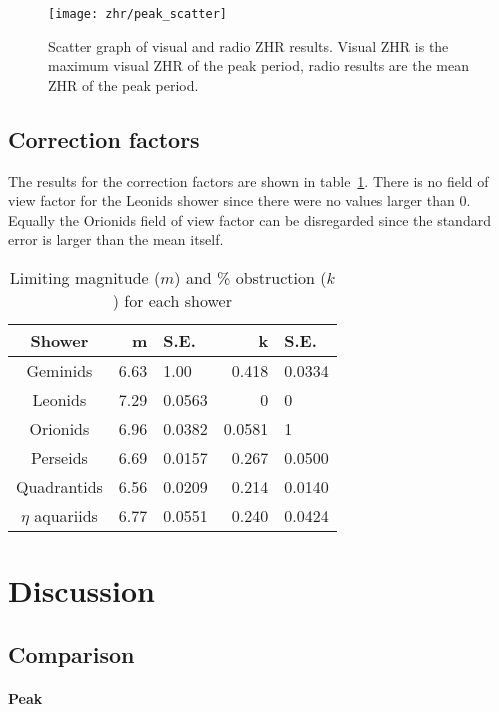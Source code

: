 \begin{figure}
	\centering
	\texttt{[image: zhr/peak\_scatter]}
	\caption{Scatter graph of visual and radio ZHR results. Visual ZHR is the
	maximum visual ZHR of the peak period, radio results are the mean ZHR of the
	peak period.}
	\label{fig:zhr:corr1}
\end{figure}

\subsection{Correction factors} 
The results for the correction factors are shown in table~\ref{tab:corfac}.
There is no field of view factor for the Leonids shower since there were no
values larger than 0. Equally the Orionids field of view factor can be
disregarded since the standard error is larger than the mean itself.

\begin{table} 
	\begin{tabular}{c r@{ \,$\pm$\, }l r@{ \,$\pm$\, }l} 
		\hline
		Shower & m & S.E. & k & S.E.\\ \hline 
		Geminids & 6.63 & 1.00 & 0.418 & 0.0334 \\ 
		Leonids & 7.29 & 0.0563 & 0 & 0 \\ 
		Orionids & 6.96 & 0.0382 & 0.0581 & 1 \\ 
		Perseids & 6.69 & 0.0157 & 0.267 & 0.0500 \\ 
		Quadrantids & 6.56 & 0.0209 & 0.214 & 0.0140 \\ 
		$\eta$ aquariids & 6.77 & 0.0551 & 0.240 & 0.0424 \\ \hline 
	 \end{tabular} 
	 \caption{Limiting magnitude ($m$) and \% obstruction ($k$) for each shower} 
	 \label{tab:corfac} 
\end{table}

\section{Discussion}

\subsection{Comparison}

\paragraph{Peak\\}

